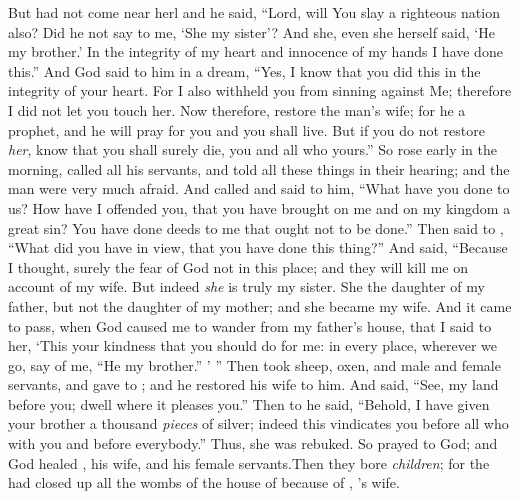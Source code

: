 \bverse But \Abimelech had not come near herl and he said, ``Lord, will You slay a righteous nation also?
\bverse Did he not say to me, `She \is my sister'? And she, even she herself said, `He \is my brother.' In the integrity of my heart and innocence of my hands I have done this.''
\bverse And God said to him in a dream, ``Yes, I know that you did this in the integrity of your heart. For I also withheld you from sinning against Me; therefore I did not let you touch her.
\bverse Now therefore, restore the man's wife; for he \is a prophet, and he will pray for you and you shall live. But if you do not restore \textit{her}, know that you shall surely die, you and all who \are yours.''
\bverse So \Abimelech rose early in the morning, called all his servants, and told all these things in their hearing; and the man were very much afraid.
\bverse And \Abimelech called \Abraham and said to him, ``What have you done to us? How have I offended you, that you have brought on me and on my kingdom a great sin? You have done deeds to me that ought not to be done.''
\bverse Then \Abimelech said to \Abraham, ``What did you have in view, that you have done this thing?''
\bverse And \Abraham said, ``Because I thought, surely the fear of God \is not in this place; and they will kill me on account of my wife.
\bverse But indeed \textit{she} is truly my sister. She \is the daughter of my father, but not the daughter of my mother; and she became my wife.
\bverse And it came to pass, when God caused me to wander from my father's house, that I said to her, `This \is your kindness that you should do for me: in every place, wherever we go, say of me, ``He \is my brother.'' ' ''
\bverse Then \Abimelech took sheep, oxen, and male and female servants, and gave \them to \Abraham; and he restored \Sarah his wife to him.
\bverse And \Abimelech said, ``See, my land \is before you; dwell where it pleases you.''
\bverse Then to \Sarah he said, ``Behold, I have given your brother a thousand \textit{pieces} of silver; indeed this vindicates you before all who \are with you and before everybody.'' Thus, she was rebuked.
\bverse So \Abraham prayed to God; and God healed \Abimelech, his wife, and his female servants.Then they bore \textit{children};
\bverse for the \lord had closed up all the wombs of the house of \Abimelech because of , \Abraham's wife.
